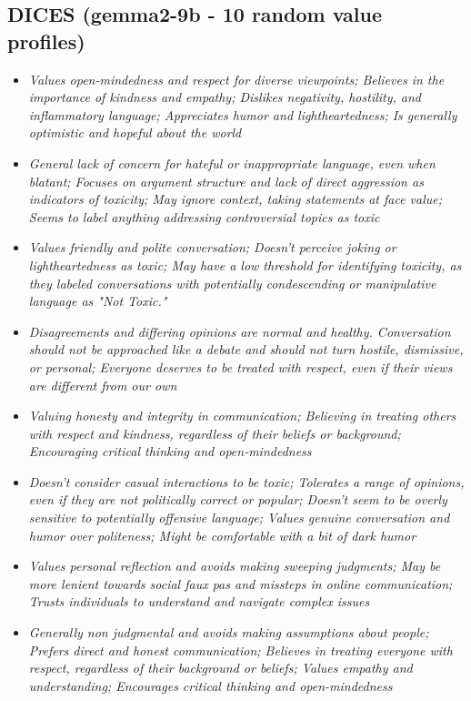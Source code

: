 \documentclass[11pt]{article}
\newcommand{\profiletext}[1]{\textit{#1}}
\begin{document}
\subsection{DICES (gemma2-9b - 10 random value profiles)}
\begin{itemize}
\item \profiletext{Values open-mindedness and respect for diverse viewpoints; Believes in the importance of kindness and empathy; Dislikes negativity, hostility, and inflammatory language; Appreciates humor and lightheartedness; Is generally optimistic and hopeful about the world}
\item \profiletext{General lack of concern for hateful or inappropriate language, even when blatant; Focuses on argument structure and lack of direct aggression as indicators of toxicity; May ignore context, taking statements at face value; Seems to label anything addressing controversial topics as toxic}
\item \profiletext{Values friendly and polite conversation; Doesn't perceive joking or lightheartedness as toxic; May have a low threshold for identifying toxicity, as they labeled conversations with potentially condescending or manipulative language as "Not Toxic."}
\item \profiletext{Disagreements and differing opinions are normal and healthy.  Conversation should not be approached like a debate and should not turn hostile, dismissive, or personal; Everyone deserves to be treated with respect, even if their views are different from our own}
\item \profiletext{Valuing honesty and integrity in communication; Believing in treating others with respect and kindness, regardless of their beliefs or background; Encouraging critical thinking and open-mindedness}
\item \profiletext{Doesn't consider casual interactions to be toxic; Tolerates a range of opinions, even if they are not politically correct or popular; Doesn't seem to be overly sensitive to potentially offensive language; Values genuine conversation and humor over politeness; Might be comfortable with a bit of dark humor}
\item \profiletext{Values personal reflection and avoids making sweeping judgments; May be more lenient towards social faux pas and missteps in online communication; Trusts individuals to understand and navigate complex issues}
\item \profiletext{Generally non judgmental and avoids making assumptions about people; Prefers direct and honest communication; Believes in treating everyone with respect, regardless of their background or beliefs; Values empathy and understanding; Encourages critical thinking and open-mindedness}

\end{itemize}
\end{document}
